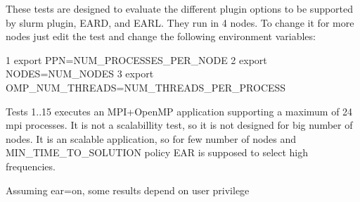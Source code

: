 These tests are designed to evaluate the different plugin options to be supported by slurm plugin, E\+A\+RD, and E\+A\+RL. They run in 4 nodes. To change it for more nodes just edit the test and change the following environment variables\+:


\begin{DoxyCode}
1 export PPN=NUM\_PROCESSES\_PER\_NODE
2 export NODES=NUM\_NODES
3 export OMP\_NUM\_THREADS=NUM\_THREADS\_PER\_PROCESS
\end{DoxyCode}


Tests 1..15 executes an M\+P\+I+\+Open\+MP application supporting a maximum of 24 mpi processes. It is not a scalabillity test, so it is not designed for big number of nodes. It is an scalable application, so for few number of nodes and M\+I\+N\+\_\+\+T\+I\+M\+E\+\_\+\+T\+O\+\_\+\+S\+O\+L\+U\+T\+I\+ON policy E\+AR is supposed to select high frequencies.


\begin{DoxyItemize}
\item Assuming ear=on, some results depend on user privilege
\end{DoxyItemize}

